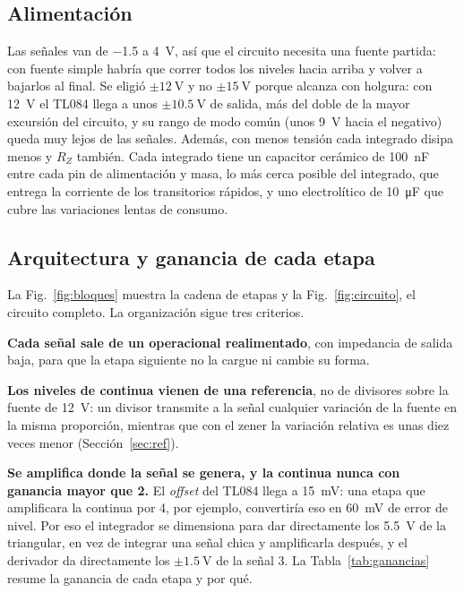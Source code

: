 \subsection{Alimentación}
\label{sec:alim}
Las señales van de \SI{-1,5}{} a \SI{4}{\volt}, así que el circuito necesita una fuente partida: con fuente simple habría que correr todos los niveles hacia arriba y volver a bajarlos al final. Se eligió $\pm\SI{12}{\volt}$ y no $\pm\SI{15}{\volt}$ porque alcanza con holgura: con \SI{12}{\volt} el TL084 llega a unos $\pm\SI{10,5}{\volt}$ de salida, más del doble de la mayor excursión del circuito, y su rango de modo común (unos \SI{9}{\volt} hacia el negativo) queda muy lejos de las señales. Además, con menos tensión cada integrado disipa menos y $R_Z$ también. Cada integrado tiene un capacitor cerámico de \SI{100}{\nano\farad} entre cada pin de alimentación y masa, lo más cerca posible del integrado, que entrega la corriente de los transitorios rápidos, y uno electrolítico de \SI{10}{\micro\farad} que cubre las variaciones lentas de consumo.

\subsection{Arquitectura y ganancia de cada etapa}
\label{sec:arq}
La Fig.~\ref{fig:bloques} muestra la cadena de etapas y la Fig.~\ref{fig:circuito}, el circuito completo. La organización sigue tres criterios.

\textbf{Cada señal sale de un operacional realimentado}, con impedancia de salida baja, para que la etapa siguiente no la cargue ni cambie su forma.

\textbf{Los niveles de continua vienen de una referencia}, no de divisores sobre la fuente de \SI{12}{\volt}: un divisor transmite a la señal cualquier variación de la fuente en la misma proporción, mientras que con el zener la variación relativa es unas diez veces menor (Sección~\ref{sec:ref}).

\textbf{Se amplifica donde la señal se genera, y la continua nunca con ganancia mayor que 2.} El \emph{offset} del TL084 llega a \SI{15}{\milli\volt}: una etapa que amplificara la continua por 4, por ejemplo, convertiría eso en \SI{60}{\milli\volt} de error de nivel. Por eso el integrador se dimensiona para dar directamente los \SI{5,5}{\volt} de la triangular, en vez de integrar una señal chica y amplificarla después, y el derivador da directamente los $\pm\SI{1,5}{\volt}$ de la señal 3. La Tabla~\ref{tab:ganancias} resume la ganancia de cada etapa y por qué.

